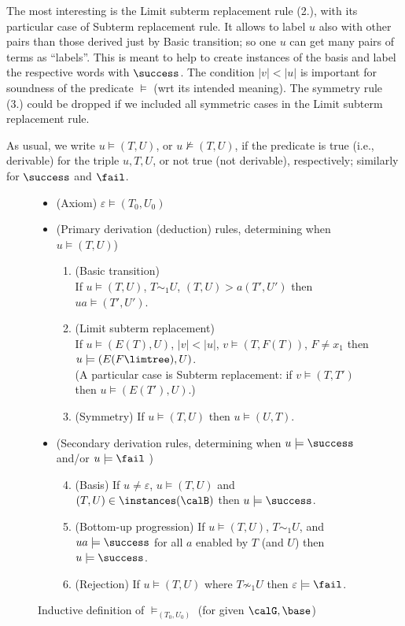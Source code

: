 \documentclass[12pt]{article}
\begin{document}
The most interesting is the 
Limit subterm replacement rule (2.),
with its particular case of Subterm replacement rule.
It allows to label $u$ also with other pairs than those derived just
by Basic transition; so one $u$ can get many pairs of terms as
``labels''.
This is meant to help
to create instances of the
basis and label the respective words with $\success$.
The condition $|v|<|u|$ is important for soundness of 
the predicate $\models$ (wrt its intended meaning).
The symmetry rule 
(3.) could be dropped if we included 
all symmetric cases in the Limit subterm replacement rule.

As usual, we write 
$u\models (T,U)$, or $u\not\models (T,U)$,
if the predicate is true (i.e., derivable) for the triple
$u,T,U$, or not true (not derivable), 
respectively; similarly for $\success$ and $\fail$.

\begin{figure}[t]
\begin{itemize}
\item
(Axiom) $\varepsilon \models (T_0,U_0)$
\item
(Primary derivation (deduction) rules, determining when $u\models (T,U)$)
\begin{enumerate}
\item (Basic transition) 
\\
If $u\models (T,U)$,  $T\sim_1 U$, $(T,U)\gt{a}(T',U')$
then $ua  \models (T',U')$.
\item (Limit subterm replacement) 
\\
If  $u\models (E(T),U)$, $|v|<|u|$,
  $v\models (T,F(T))$, $F\neq x_1$ 
then $u\models (E(F\limtree),U)$.
\\
(A particular case is Subterm replacement:
if $v\models (T,T')$ then $u\models (E(T'),U)$.)

\item (Symmetry)
If  $u\models (T,U)$ then  $u\models
(U,T)$.
\end{enumerate}
\item
(Secondary derivation rules, determining when $u\models\success$ and/or
$u\models\fail$ )
\begin{enumerate}
\setcounter{enumi}{3}
\item (Basis)
If $u\neq\varepsilon$, 
$u\models (T,U)$ and $(T,U)\in\instances(\calB)$ then 
$u\models\success$.
\item
(Bottom-up progression)
If $u\models (T,U)$, $T\sim_1 U$,
and $ua\models \success$
for all $a$ enabled by $T$ (and $U$)
then
$u\models\success$.
\item (Rejection)
If   $u\models (T,U)$ where $T\not\sim_1 U$ then 
$\varepsilon\models \fail$.
\end{enumerate}
\end{itemize}
\caption{Inductive definition of $\models_{(T_0,U_0)}$
(for given $\calG,\base$)
}\label{fig:dersystem1}
\end{figure}
\end{document}
